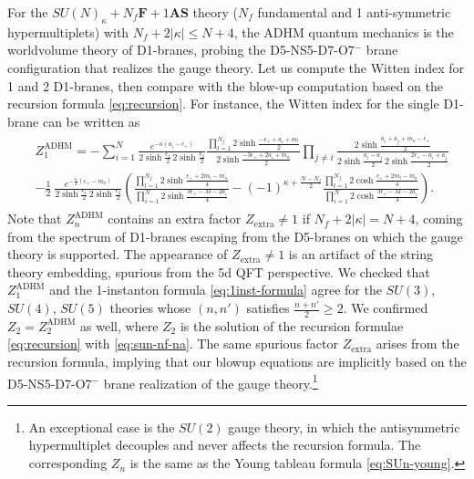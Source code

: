\documentclass[letterpaper, 11pt]{article}
\def\e{\epsilon}
\def\k{\kappa}
\begin{document}
{For the $SU(N)_\kappa + N_f\mathbf{F} + 1\mathbf{AS}$ theory ($N_f$ fundamental and 1 anti-symmetric hypermultiplets) with $N_f + 2|\kappa| \leq N+4$, the ADHM quantum mechanics is the worldvolume theory of D1-branes, probing the D5-NS5-D7-O7${}^{-}$ brane configuration that realizes the gauge theory. Let us compute the Witten index for 1 and 2 D1-branes, then compare with the blow-up computation based on the recursion formula \eqref{eq:recursion}. For instance, the Witten index for the single D1-brane can be written as
\begin{align}
\begin{split}
  &Z_1^\text{ADHM} = - \sum_{i=1}^N \frac{e^{-\k (a_i - \e_+)}}{2\sinh{\frac{\e_1}{2}}\,2\sinh{\frac{\e_2}{2}}} \frac{\prod_{l=1}^{N_f}2\sinh{\frac{-\e_+ + a_i + m_l}{2}}}{2\sinh{\frac{-3\e_+ + 2a_i + m_a}{2}}} \prod_{j \neq i}\frac{2\sinh{\frac{a_i + a_j + m_a - \e_+}{2}}}{2\sinh{ \frac{a_{i}-a_j}{2}}\, 2\sinh{\frac{2\e_+ - a_i + a_j}{2}}}  \\
  &- \frac{1}{2}\ \frac{e^{-\frac{\k}{2}(\e_+ - m_a)}}{2\sinh{\frac{\e_1}{2}}\,2\sinh{\frac{\e_2}{2}}} \left(\frac{\prod_{l=1}^{N_f} 2\sinh{\frac{\e_+ + 2m_l - m_a}{4}}}{\prod_{i=1}^N 2\sinh{\frac{3\e_+ - M - 2a_i}{4}}} - (-1)^{\k + \frac{N-N_f}{2}}\frac{\prod_{l=1}^{N_f} 2\cosh{\frac{\e_+ + 2m_l - m_a}{4}}}{\prod_{i=1}^N 2\cosh{\frac{3\e_+ - M - 2a_i}{4}}}\right).
\end{split}
\end{align}
Note that $Z_n^\text{ADHM}$ contains an extra factor $Z_\text{extra} \neq 1$ if $N_f + 2|\k| = N+4$, coming from the spectrum of D1-branes escaping from the D5-branes on which the gauge theory is supported. 
The appearance of $Z_\text{extra}\neq 1$ is an artifact of the string theory embedding, spurious from the 5d QFT perspective.
We checked that $Z_1^\text{ADHM}$ and the 1-instanton formula \eqref{eq:1inst-formula} agree for the $SU(3)$, $SU(4)$, $SU(5)$ theories whose $(n,n')$ satisfies $\frac{n+n'}{2} \geq 2$. 
We confirmed $Z_2 = Z_2^\text{ADHM}$ as well, where $Z_2$ is the solution of the recursion formulae \eqref{eq:recursion} with \eqref{eq:sun-nf-na}. The same spurious factor $Z_\text{extra}$ arises from the recursion formula, implying that our blowup equations are implicitly based on the D5-NS5-D7-O7${}^{-}$ brane realization of the gauge theory.\footnote{An exceptional case is the $SU(2)$ gauge theory, in which the antisymmetric hypermultiplet decouples and never affects the recursion formula. The corresponding $Z_n$ is the same as the Young tableau formula \eqref{eq:SUn-young}.}

}
\end{document}
